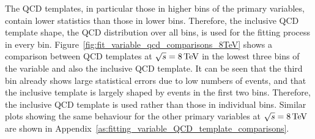 \FloatBarrier

The QCD templates, in particular those in higher bins of the primary variables, contain lower statistics than
those in lower bins. Therefore, the inclusive QCD template shape, \ie the QCD distribution over all bins, is
used for the fitting process in every bin. Figure~\ref{fig:fit_variable_qcd_comparisons_8TeV} shows a
comparison between QCD templates at $\sqrt{s}=8\,\text{Te\hspace{-.08em}V}$ in the lowest three bins of the \met variable and also the
inclusive \met QCD template. It can be seen that the third \met bin already shows large statistical errors due
to low numbers of events, and that the inclusive template is largely shaped by events in the first two bins.
Therefore, the inclusive QCD template is used rather than those in individual bins. Similar plots showing the
same behaviour for the other primary variables at $\sqrt{s}=8\,\text{Te\hspace{-.08em}V}$ are shown in
Appendix~\ref{as:fitting_variable_QCD_template_comparisons}.

